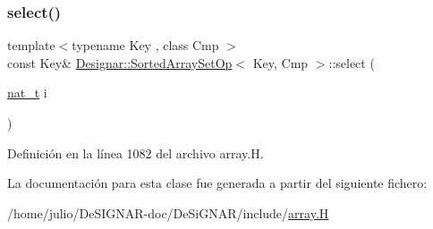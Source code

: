 \subsubsection{\texorpdfstring{select()}{select()}}
{\footnotesize\ttfamily template$<$typename Key , class Cmp $>$ \\
const Key\& \hyperlink{class_designar_1_1_sorted_array_set_op}{Designar\+::\+Sorted\+Array\+Set\+Op}$<$ Key, Cmp $>$\+::select (\begin{DoxyParamCaption}\item[{\hyperlink{namespace_designar_aa72662848b9f4815e7bf31a7cf3e33d1}{nat\+\_\+t}}]{i }\end{DoxyParamCaption})\hspace{0.3cm}{\ttfamily [inline]}}



Definición en la línea 1082 del archivo array.\+H.



La documentación para esta clase fue generada a partir del siguiente fichero\+:\begin{DoxyCompactItemize}
\item 
/home/julio/\+De\+S\+I\+G\+N\+A\+R-\/doc/\+De\+Si\+G\+N\+A\+R/include/\hyperlink{array_8_h}{array.\+H}\end{DoxyCompactItemize}
